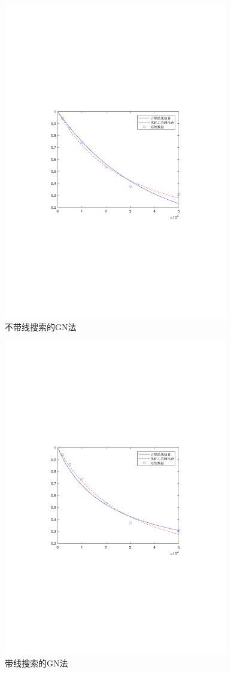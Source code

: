 \begin{figure}[H]
\centering
\includegraphics[width=9.8cm]{fig/6_5.pdf}
\caption{不带线搜索的GN法}
\end{figure}

\begin{figure}[H]
\centering
\includegraphics[width=9.8cm]{fig/6_6.pdf}
\caption{带线搜索的GN法}
\end{figure}

